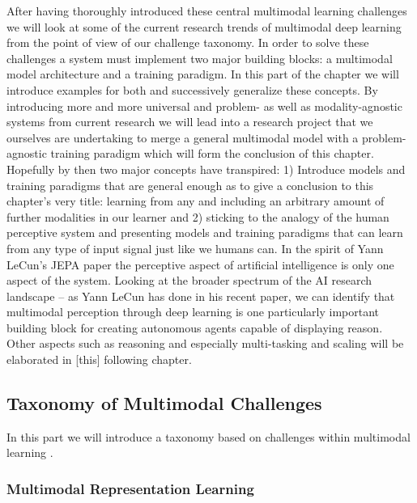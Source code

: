 \documentclass[
]{krantz}
\begin{document}
After having thoroughly introduced these central multimodal learning challenges we will look at some of the current research trends of multimodal deep learning from the point of view of our challenge taxonomy. In order to solve these challenges a system must implement two major building blocks: a multimodal model architecture and a training paradigm. In this part of the chapter we will introduce examples for both and successively generalize these concepts. By introducing more and more universal and problem- as well as modality-agnostic systems from current research we will lead into a research project that we ourselves are undertaking to merge a general multimodal model with a problem-agnostic training paradigm which will form the conclusion of this chapter. Hopefully by then two major concepts have transpired: 1) Introduce models and training paradigms that are general enough as to give a conclusion to this chapter's very title: learning from any and including an arbitrary amount of further modalities in our learner and 2) sticking to the analogy of the human perceptive system and presenting models and training paradigms that can learn from any type of input signal just like we humans can. In the spirit of Yann LeCun's JEPA paper the perceptive aspect of artificial intelligence is only one aspect of the system. Looking at the broader spectrum of the AI research landscape -- as Yann LeCun has done in his recent paper, we can identify that multimodal perception through deep learning is one particularly important building block for creating autonomous agents capable of displaying reason. Other aspects such as reasoning and especially multi-tasking and scaling will be elaborated in {[}this{]} following chapter.

\hypertarget{taxonomy-of-multimodal-challenges}{%
\subsection{Taxonomy of Multimodal Challenges}\label{taxonomy-of-multimodal-challenges}}

In this part we will introduce a taxonomy based on challenges within multimodal learning \citep{baltrušaitis2017multimodal}.

\hypertarget{multimodal-representation-learning}{%
\subsubsection{Multimodal Representation Learning}\label{multimodal-representation-learning}}
\end{document}
